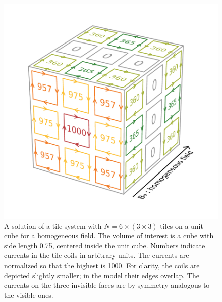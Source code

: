 \begin{figure}
  \centering
  \includegraphics[width=\linewidth]{gfx/coils/homogeneous_tiles_norm_1000.pdf}
  \caption{A solution of a tile system with $N = 6 \times (3 \times 3)$ tiles on a unit cube for a homogeneous field. The volume of interest is a cube with side length 0.75, centered inside the unit cube. Numbers indicate currents in the tile coils in arbitrary units. The currents are normalized so that the highest is 1000. For clarity, the coils are depicted slightly smaller; in the model their edges overlap. The currents on the three invisible faces are by symmetry analogous to the visible ones.}
  \label{fig:homogeneous_tiles}
\end{figure}


